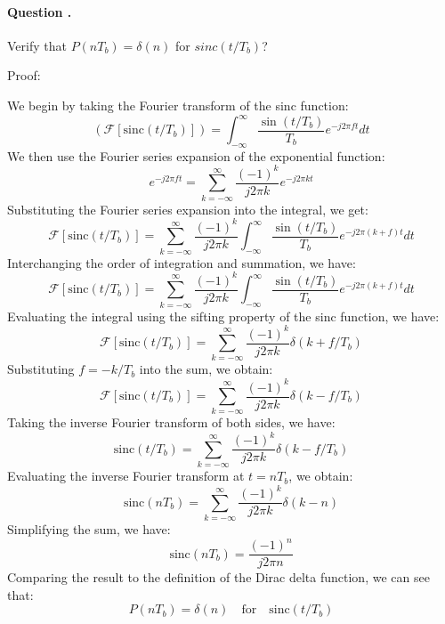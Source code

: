 \documentclass[14pt,a4paper]{report}
\newcounter{question}
\newcommand*\question{%
\stepcounter{question}%
\paragraph{Question \thesection.\thequestion}}
\begin{document}
\question 
{
    Verify that $P (nT_b ) = \delta (n)$ for $sinc(t/T_b )$?
}
\begin{answer_box*}
Proof:

We begin by taking the Fourier transform of the sinc function:
\begin{equation}
\left(\mathcal{F}[\text{sinc}(t/T_b)]\right) = \int_{-\infty}^{\infty} \frac{\sin(t/T_b)}{T_b} e^{-j2\pi ft} dt
\end{equation}
We then use the Fourier series expansion of the exponential function:
\begin{equation}
e^{-j2\pi ft} = \sum_{k=-\infty}^{\infty} \frac{(-1)^k}{j2\pi k} e^{-j2\pi kt}
\end{equation}
Substituting the Fourier series expansion into the integral, we get:
\begin{equation}
\mathcal{F}[\text{sinc}(t/T_b)] = \sum_{k=-\infty}^{\infty} \frac{(-1)^k}{j2\pi k} \int_{-\infty}^{\infty} \frac{\sin(t/T_b)}{T_b} e^{-j2\pi (k+f)t} dt
\end{equation}
Interchanging the order of integration and summation, we have:
\begin{equation}
\mathcal{F}[\text{sinc}(t/T_b)] = \sum_{k=-\infty}^{\infty} \frac{(-1)^k}{j2\pi k} \int_{-\infty}^{\infty} \frac{\sin(t/T_b)}{T_b} e^{-j2\pi (k+f)t} dt
\end{equation}
Evaluating the integral using the sifting property of the sinc function, we have:
\begin{equation}
\mathcal{F}[\text{sinc}(t/T_b)] = \sum_{k=-\infty}^{\infty} \frac{(-1)^k}{j2\pi k} \delta(k+f/T_b)
\end{equation}
Substituting $f = -k/T_b$ into the sum, we obtain:
\begin{equation}
\mathcal{F}[\text{sinc}(t/T_b)] = \sum_{k=-\infty}^{\infty} \frac{(-1)^k}{j2\pi k} \delta(k-f/T_b)
\end{equation}
Taking the inverse Fourier transform of both sides, we have:
\begin{equation}
\text{sinc}(t/T_b) = \sum_{k=-\infty}^{\infty} \frac{(-1)^k}{j2\pi k} \delta(k-f/T_b)
\end{equation}
Evaluating the inverse Fourier transform at $t = nT_b$, we obtain:
\begin{equation}
\text{sinc}(nT_b) = \sum_{k=-\infty}^{\infty} \frac{(-1)^k}{j2\pi k} \delta(k-n)
\end{equation}
Simplifying the sum, we have:
\begin{equation}
\text{sinc}(nT_b) = \frac{(-1)^n}{j2\pi n}
\end{equation}
Comparing the result to the definition of the Dirac delta function, we can see that:
\begin{equation}
P(nT_b) = \delta(n) \quad \text{for} \quad \text{sinc}(t/T_b)
\end{equation}
\end{answer_box*}
\end{document}
